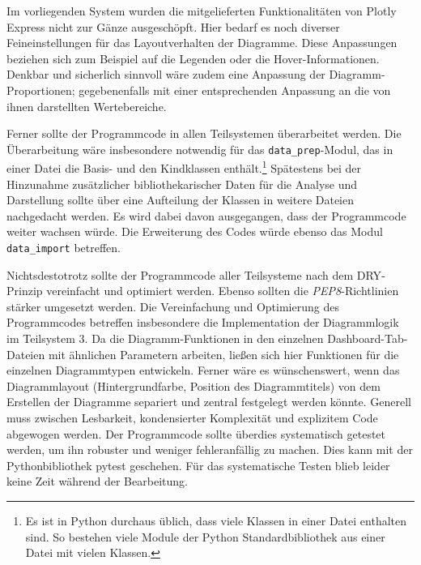Im vorliegenden System wurden die mitgelieferten Funktionalitäten von Plotly Express nicht zur Gänze ausgeschöpft. Hier bedarf es noch diverser Feineinstellungen für das Layoutverhalten der Diagramme.
Diese Anpassungen beziehen sich zum Beispiel auf die Legenden oder die Hover-Informationen.
Denkbar und sicherlich sinnvoll wäre zudem eine Anpassung der Diagramm-Proportionen; gegebenenfalls mit einer entsprechenden Anpassung an die von ihnen darstellten Wertebereiche. 


Ferner sollte der Programmcode in allen Teilsystemen überarbeitet werden. Die Überarbeitung wäre insbesondere notwendig für das \texttt{data\_prep}-Modul, 
das in einer Datei die Basis- und den Kindklassen enthält.\footnote{Es ist in Python durchaus üblich, dass viele Klassen in einer Datei enthalten sind. 
So bestehen viele Module der Python Standardbibliothek aus einer Datei mit vielen Klassen.}
Spätestens bei der Hinzunahme zusätzlicher bibliothekarischer Daten für die Analyse und Darstellung sollte über eine Aufteilung der Klassen in weitere Dateien nachgedacht werden. 
Es wird dabei davon ausgegangen, dass der Programmcode weiter wachsen würde. Die Erweiterung des Codes würde ebenso das Modul \texttt{data\_import} betreffen. 

Nichtsdestotrotz sollte der Programmcode aller Teilsysteme nach dem \acrfull{DRY}-Prinzip vereinfacht und optimiert werden.
Ebenso sollten die \textit{\acrshort{PEP8}}-Richtlinien stärker umgesetzt werden.
Die Vereinfachung und Optimierung des Programmcodes betreffen insbesondere die Implementation der Diagrammlogik im Teilsystem 3. Da die Diagramm-Funktionen in den einzelnen Dashboard-Tab-Dateien mit ähnlichen Parametern arbeiten, 
ließen sich hier Funktionen für die einzelnen Diagrammtypen entwickeln. Ferner wäre es wünschenswert, wenn das Diagrammlayout (Hintergrundfarbe, Position des Diagrammtitels) 
von dem Erstellen der Diagramme separiert und zentral festgelegt werden könnte. 
Generell muss zwischen Lesbarkeit, kondensierter Komplexität und explizitem Code abgewogen werden. %
Der Programmcode sollte überdies systematisch getestet werden, um ihn robuster und weniger fehleranfällig zu machen. 
Dies kann mit der Pythonbibliothek pytest geschehen. Für das systematische Testen blieb leider keine Zeit während der Bearbeitung.


